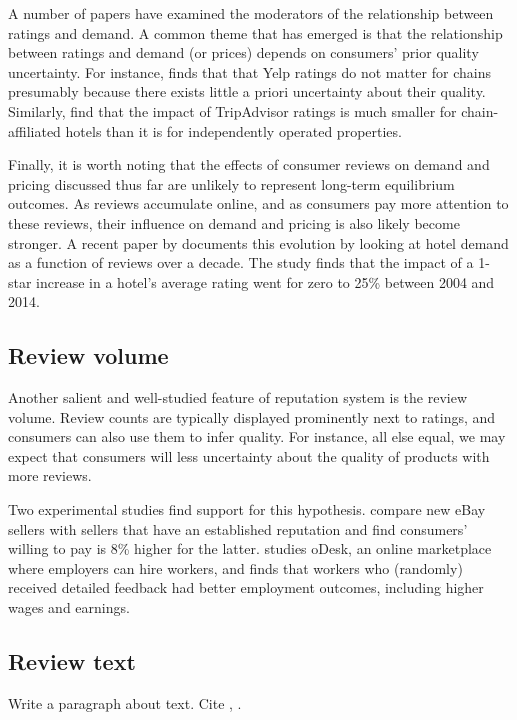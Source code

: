 \documentclass[letter,12pt]{article}
\begin{document}
A number of papers have examined the moderators of the relationship between
ratings and demand. A common theme that has emerged is that the relationship
between ratings and demand (or prices) depends on consumers' prior quality
uncertainty. For instance, \citet{luca2016reviews} finds that that Yelp
ratings do not matter for chains presumably because there exists little a
priori uncertainty about their quality. Similarly, \citet{lewis2016welfare}
find that the impact of TripAdvisor ratings is much smaller for
chain-affiliated hotels than it is for independently operated properties.

Finally, it is worth noting that the effects of consumer reviews on demand and
pricing discussed thus far are unlikely to represent long-term equilibrium
outcomes. As reviews accumulate online, and as consumers pay more attention to
these reviews, their influence on demand and pricing is also likely become
stronger. A recent paper by \cite{lewis2016welfare} documents this evolution
by looking at hotel demand as a function of reviews over a decade. The study
finds that the impact of a 1-star increase in a hotel's average rating went
for zero to 25\% between 2004 and 2014.

\subsection{Review volume}

Another salient and well-studied feature of reputation system is the review
volume. Review counts are typically displayed prominently next to ratings, and
consumers can also use them to infer quality. For instance, all else equal, we
may expect that consumers will less uncertainty about the quality of products
with more reviews. 

Two experimental studies find support for this hypothesis.
\citet{resnick2006value} compare new eBay sellers with sellers that have an
established reputation and find consumers' willing to pay is 8\% higher for
the latter. \citet{pallais2014inefficient} studies oDesk, an online
marketplace where employers can hire workers, and finds that workers who
(randomly) received detailed feedback had better employment outcomes,
including higher wages and earnings.

\subsection{Review text}

Write a paragraph about text. Cite \citet{ghose2012designing},
\citet{packard2017language}.
\end{document}
